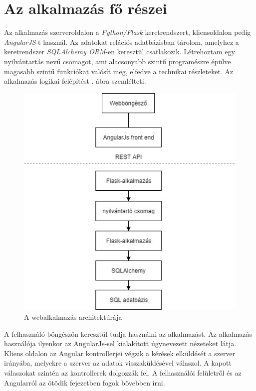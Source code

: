 \section{Az alkalmazás fő részei}

Az alkalmazás szerveroldalon a \textit{Python/Flask} keretrendszert, kliensoldalon pedig \textit{AngularJS}-t használ. Az adatokat relációs adatbázisban tárolom, amelyhez a keretrendszer \textit{SQLAlchemy ORM}-en keresztül csatlakozik. Létrehoztam egy nyilvántartás nevű csomagot, ami alacsonyabb szintű programészre épülve magasabb szintű funkciókat valósít meg, elfedve a technikai részleteket. Az alkalmazás logikai felépítést . ábra szemlélteti.

\begin{figure}
\centering
\includegraphics[scale=0.8]{kepek/architecture.jpg}
\caption{A webalkalmazás architektúrája}
\label{fig:architecture}
\end{figure}

A felhasználó böngészőn keresztül tudja használni az alkalmazást. Az alkalmazás használója ilyenkor az AngularJs-sel kialakított úgynevezett nézeteket látja. Kliens oldalon az Angular kontrollerjei végzik a kérések elküldését a szerver irányába, melyekre a szerver az adatok visszaküldésével válaszol. A kapott válaszokat szintén az kontrollerek dolgozzák fel. A felhasználói felületről és az Angularról az ötödik fejezetben fogok bővebben írni.


